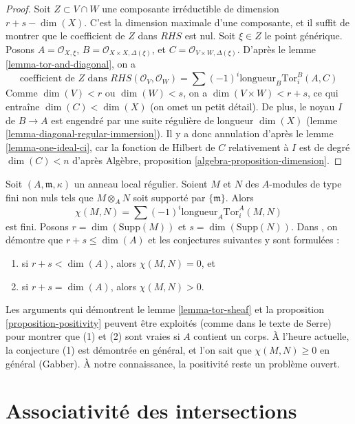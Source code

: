 \begin{proof}
\medskip\noindent
Soit $Z \subset V \cap W$ une composante irréductible de dimension
$r + s - \dim(X)$. C'est la dimension maximale d'une composante,
et il suffit de montrer que le coefficient de $Z$ dans $RHS$ est nul.
Soit $\xi \in Z$ le point générique. Posons $A = \mathcal{O}_{X, \xi}$,
$B = \mathcal{O}_{X \times X, \Delta(\xi)}$, et
$C = \mathcal{O}_{V \times W, \Delta(\xi)}$.
D'après le lemme \ref{lemma-tor-and-diagonal}, on a
$$
\text{coefficient de }Z\text{ dans }
RHS(\mathcal{O}_V, \mathcal{O}_W) = 
\sum (-1)^i
\text{longueur}_B \text{Tor}_i^B(A, C)
$$
Comme $\dim(V) < r$ ou $\dim(W) < s$, on a $\dim(V \times W) < r + s$,
ce qui entraîne $\dim(C) < \dim(X)$ (on omet un petit détail). De plus, le
noyau $I$ de $B \to A$ est engendré par une suite régulière de
longueur $\dim(X)$ (lemme \ref{lemma-diagonal-regular-immersion}).
Il y a donc annulation d'après le lemme \ref{lemma-one-ideal-ci}, car
la fonction de Hilbert de $C$ relativement à $I$ est de degré $\dim(C) < n$
d'après Algèbre, proposition \ref{algebra-proposition-dimension}.
\end{proof}

\begin{remark}
\label{remark-Serre-conjectures}
Soit $(A, \mathfrak m, \kappa)$ un anneau local régulier.
Soient $M$ et $N$ des $A$-modules de type fini non nuls tels que $M \otimes_A N$
soit supporté par $\{\mathfrak m\}$. Alors
$$
\chi(M, N) = \sum (-1)^i \text{longueur}_A \text{Tor}_i^A(M, N)
$$
est fini. Posons $r = \dim(\text{Supp}(M))$ et $s = \dim(\text{Supp}(N))$.
Dans \cite{Serre_algebre_locale}, on démontre que $r + s \leq \dim(A)$
et les conjectures suivantes y sont formulées :
\begin{enumerate}
\item si $r + s < \dim(A)$, alors $\chi(M, N) = 0$, et
\item si $r + s = \dim(A)$, alors $\chi(M, N) > 0$.
\end{enumerate}
Les arguments qui démontrent le lemme \ref{lemma-tor-sheaf} et
la proposition \ref{proposition-positivity} peuvent être exploités
(comme dans le texte de Serre) pour montrer que (1) et (2) sont
vraies si $A$ contient un corps. À l'heure actuelle, la conjecture (1) est démontrée
en général, et l'on sait que $\chi(M, N) \geq 0$ en général (Gabber).
À notre connaissance, la positivité reste un problème ouvert.
\end{remark}



\section{Associativité des intersections}
\label{section-associative}

